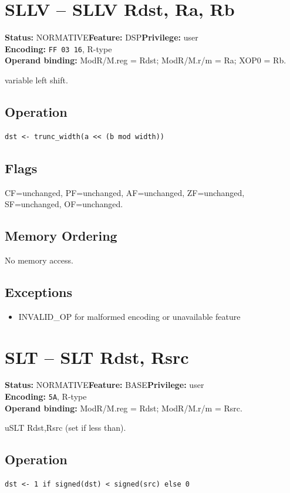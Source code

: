 \documentclass[10pt]{article}
\begin{document}
\section{SLLV -- SLLV Rdst, Ra, Rb}
\textbf{Status:} NORMATIVE\quad \textbf{Feature:} DSP\quad \textbf{Privilege:} user\\
\textbf{Encoding:} \texttt{FF 03 16}, R-type\\
\textbf{Operand binding:} ModR/M.reg = Rdst; ModR/M.r/m = Ra; XOP0 = Rb.

variable left shift.

\subsection*{Operation}
\begin{lstlisting}
dst <- trunc_width(a << (b mod width))
\end{lstlisting}
\subsection*{Flags}
CF=unchanged, PF=unchanged, AF=unchanged, ZF=unchanged, SF=unchanged, OF=unchanged.
\subsection*{Memory Ordering}
No memory access.
\subsection*{Exceptions}
\begin{itemize}
\item INVALID\_OP for malformed encoding or unavailable feature
\end{itemize}
\clearpage

\section{SLT -- SLT Rdst, Rsrc}
\textbf{Status:} NORMATIVE\quad \textbf{Feature:} BASE\quad \textbf{Privilege:} user\\
\textbf{Encoding:} \texttt{5A}, R-type\\
\textbf{Operand binding:} ModR/M.reg = Rdst; ModR/M.r/m = Rsrc.

uSLT Rdst,Rsrc (set if less than).

\subsection*{Operation}
\begin{lstlisting}
dst <- 1 if signed(dst) < signed(src) else 0
\end{lstlisting}
\end{document}
